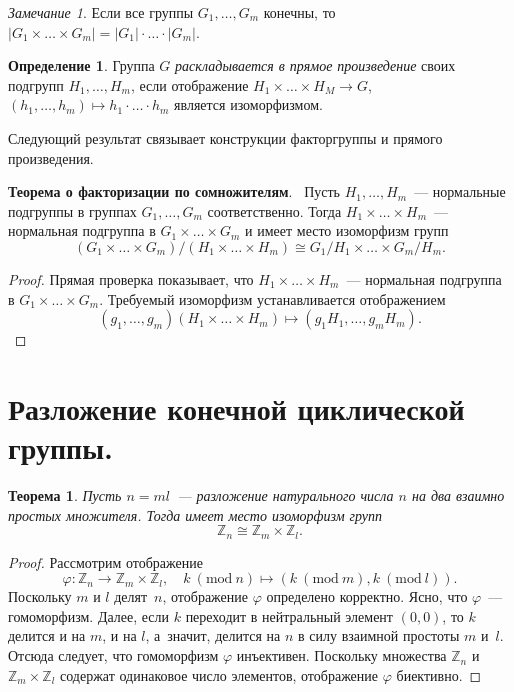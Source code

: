\documentclass[a4paper, 12pt]{article}
\def\ZZ{{\mathbb Z}}%
\newtheorem{theorem}{Теорема}
\theoremstyle{definition}
\newtheorem{definition}{Определение}
\theoremstyle{remark}
\newtheorem{remark}{Замечание}
\begin{document}
\begin{remark}
Если все группы $G_1, \ldots, G_m$ конечны, то $|G_1 \times \ldots
\times G_m| = |G_1| \cdot \ldots \cdot |G_m|$.
\end{remark}

\begin{definition}
Группа $G$ \textit{раскладывается в прямое произведение} своих подгрупп $H_1, \ldots, H_m$, если отображение $H_1 \times \ldots \times H_M \rightarrow G$, $(h_1, \ldots, h_m) \mapsto h_1 \cdot \ldots \cdot h_m$ является изоморфизмом.
\end{definition}
Следующий результат связывает конструкции факторгруппы и прямого
произведения.

{\bf Теорема о факторизации по сомножителям}. \ Пусть $H_1, \ldots,
H_m$~--- нормальные подгруппы в группах $G_1, \ldots, G_m$
соответственно. Тогда $H_1 \times \ldots \times H_m$~--- нормальная
подгруппа в $G_1 \times \ldots \times G_m$ и имеет место изоморфизм
групп
$$
(G_1 \times \ldots \times G_m) / (H_1 \times \ldots \times H_m)
\cong G_1 / H_1 \times \ldots \times G_m / H_m.
$$

\begin{proof}
Прямая проверка показывает, что $H_1\times\ldots\times H_m$~---
нормальная подгруппа в $G_1\times\ldots\times G_m$. Требуемый
изоморфизм устанавливается отображением
$$
(g_1,\ldots,g_m)(H_1\times\ldots\times H_m)\mapsto
(g_1H_1,\ldots,g_mH_m).
$$
\end{proof}


\section{Разложение конечной циклической группы.}

\begin{theorem}
Пусть $n=ml$~--- разложение натурального числа $n$ на два взаимно
простых множителя. Тогда имеет место изоморфизм групп
$$
\ZZ_n\cong \ZZ_m\times\ZZ_l.
$$
\end{theorem}

\begin{proof}
Рассмотрим отображение
$$
\varphi\colon \ZZ_n\to \ZZ_m\times\ZZ_l, \quad k \ (\text{mod}\ n)
\mapsto (k\ (\text{mod}\ m), k\ (\text{mod}\  l)).
$$
Поскольку $m$ и $l$ делят~$n$, отображение $\varphi$ определено
корректно. Ясно, что $\varphi$~--- гомоморфизм. Далее, если $k$
переходит в нейтральный элемент $(0,0)$, то $k$ делится и на $m$, и
на $l$, а~значит, делится на $n$ в силу взаимной простоты $m$ и~$l$.
Отсюда следует, что гомоморфизм $\varphi$ инъективен. Поскольку
множества $\ZZ_n$ и $\ZZ_m\times\ZZ_l$ содержат одинаковое число
элементов, отображение $\varphi$ биективно.
\end{proof}
\end{document}
